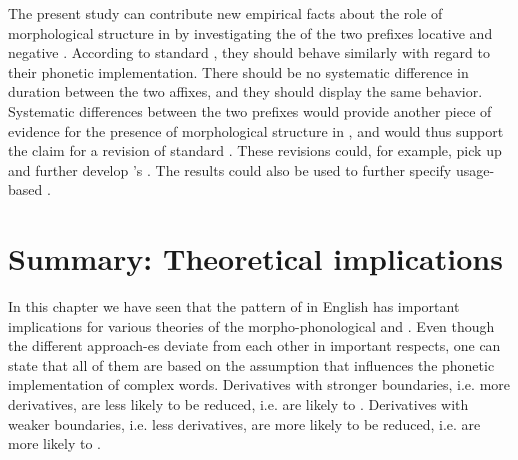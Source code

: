 {{{ 

 
 
 The present study can contribute new empirical facts about the role of morphological structure in  by investigating the  of the two  prefixes locative and negative . According to standard , they should behave similarly with regard to their phonetic implementation. There should be no systematic difference in duration between the two affixes, and they should display the same  behavior. Systematic differences between the two prefixes would provide another piece of evidence for the presence of morphological structure in , and would thus support the claim for a revision of standard . These revisions could, for example, pick up and further develop \citeauthor{CohenGoldberg.2013}'s  . The results could also be used to further specify usage-based .



 
 




\section{Summary: Theoretical implications}\label{summary predictions}

 In this chapter we have seen that the pattern of  in English  has important implications for various theories of the morpho-phonological and . Even though the different approach-es deviate from each other in important respects, one can state that all of them are based on the assumption that  influences the phonetic implementation of complex words. Derivatives with stronger boundaries, i.e. more  derivatives, are less likely to be reduced, i.e. are likely to . Derivatives with weaker boundaries, i.e. less  derivatives, are more likely to be reduced, i.e. are more likely to . 
 

}}}
